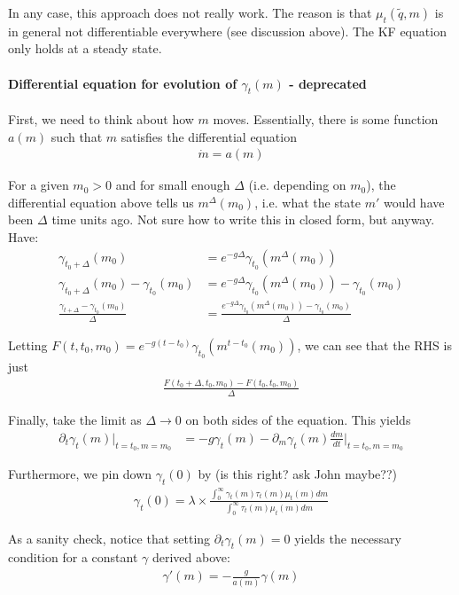 \documentclass[12pt,english]{article}
\theoremstyle{remark}
\begin{document}
In any case, this approach does not really work. The reason is that $\mu_t(\tilde{q},m)$ is in general not differentiable everywhere (see discussion above). The KF equation only holds at a steady state. 










\pagebreak









\paragraph{Differential equation for evolution of $\gamma_t(m)$ - deprecated}
First, we need to think about how $m$ moves. Essentially, there is some function $a(m)$ such that $m$ satisfies the differential equation 
\begin{align*}
\dot{m} = a(m)
\end{align*} 

For a given $m_0 > 0$ and for small enough $\Delta$ (i.e. depending on $m_0$), the differential equation above tells us $m^{\Delta}(m_0)$, i.e. what the state $m'$ would have been $\Delta$ time units ago. Not sure how to write this in closed form, but anyway. Have: 
\begin{align*}
\gamma_{t_0+\Delta} (m_0) &= e^{-g \Delta} \gamma_{t_0}(m^\Delta(m_0)) \\
\gamma_{t_0 + \Delta} (m_0) - \gamma_{t_0} (m_0) &= e^{-g \Delta} \gamma_{t_0}(m^{\Delta}(m_0)) - \gamma_{t_0}(m_0) \\
\frac{\gamma_{t+\Delta} - \gamma_{t_0}(m_0)}{\Delta} &= \frac{e^{-g\Delta} \gamma_{t_0}(m^{\Delta}(m_0)) - \gamma_{t_0}(m_0)}{\Delta}
\end{align*}

Letting $F(t,t_0,m_0) = e^{-g(t-t_0)}\gamma_{t_0}(m^{t-t_0}(m_0))$, we can see that the RHS is just 
\begin{align*}
\frac{F(t_0+\Delta,t_0,m_0) - F(t_0,t_0,m_0)}{\Delta}
\end{align*}

Finally, take the limit as $\Delta \to 0$ on both sides of the equation. This yields 
\begin{align*}
\partial_t \gamma_t(m) \Big|_{t = t_0,m=m_0} &= -g \gamma_t(m) - \partial_m \gamma_t(m) \frac{dm}{dt} \Big|_{t = t_0,m=m_0}
\end{align*}

Furthermore, we pin down $\gamma_t(0)$ by (is this right? ask John maybe??)
\begin{align*}
\gamma_t(0) = \lambda \times \frac{\int_{0}^{\infty} \gamma_t(m) \tau_t(m) \mu_t(m) dm}{\int_{0}^{\infty} \tau_t(m) \mu_t(m) dm}
\end{align*}

As a sanity check, notice that setting $\partial_t \gamma_t(m) = 0$ yields the necessary condition for a constant $\gamma$ derived above:
\begin{align*}
\gamma'(m) = -\frac{g}{a(m)} \gamma(m) 
\end{align*}
\end{document}
